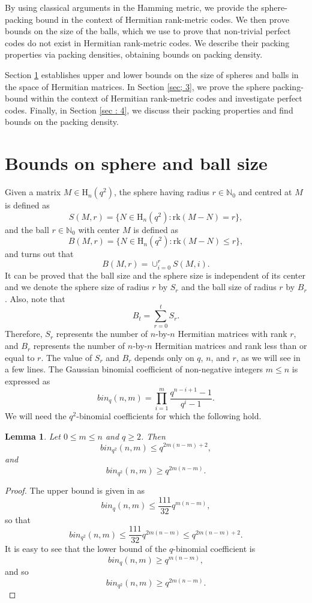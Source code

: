 \documentclass[12pt,a4paper]{article}
\newtheorem{lemma}[theorem]{Lemma}
\begin{document}
 
By using classical arguments in the Hamming metric, we provide the sphere-packing bound in the context of Hermitian rank-metric codes. We then prove bounds on the size of the balls, which we use to prove that non-trivial perfect codes do not exist in Hermitian rank-metric codes. We describe their packing properties via packing densities, obtaining bounds on packing density.

 
Section \ref{sec: 2} establishes upper and lower bounds on the size of spheres and balls in the space of Hermitian matrices. In Section \ref{sec; 3}, we prove the sphere packing-bound within the context of Hermitian rank-metric codes and investigate perfect codes. Finally, in Section \ref{sec : 4}, we discuss their packing properties and find bounds on the {packing density}.  
 
\section{Bounds on sphere and ball size}\label{sec: 2}
Given a matrix $M\in \mathrm{H}_{n}(q^2)$, the sphere having radius $r\in \mathbb{N}_0$  and centred at $M$ is defined as \[ S(M,r)=\{ N \in  \mathrm{H}_n(q^2) \colon \mathrm{rk}(M-N)=r\}, \]
and the ball $r\in \mathbb{N}_0$ with center $M$ is defined as
\[B(M,r)=\{ N \in  \mathrm{H}_n(q^2) \colon \mathrm{rk}(M-N)\leq r\},\]
and turns out that
\[ B(M,r)=\cup_{i=0}^r S(M,i). \]
It can be proved that the ball size and the sphere size is independent of its center and we denote the sphere size of radius $r$ by $S_r$ and the ball size of radius $r$ by $B_r$. Also, note that
\begin{equation*}
  B_t=\sum_{r=0}^{t}S_r.  
\end{equation*}
Therefore, $S_r$ represents the number of $n$-by-$n$ Hermitian matrices with rank $r$, and $B_r$ represents the number of $n$-by-$n$ Hermitian matrices and rank less than or equal to $r$. The value of $S_r$ and $B_r$ depends only on $q$, $n$, and $r$, as we will see in a few lines.
The Gaussian binomial coefficient of non-negative integers $m\leq n$ is expressed as
\[bin_{q}(n,m)=\prod_{i=1}^{m}\frac{q^{n-i+1}-1}{q^{i}-1}.\]
We will need the $q^2$-binomial coefficients for which the following hold.
\begin{lemma}\label{bin}
 Let $0\leq m\leq n$ and $q\geq2$.
 Then
 \[bin_{q^2}(n,m)\leq q^{2m(n-m)+2},\]
 and 
 \[bin_{q^2}(n,m)\geq q^{2m(n-m)}. \]
\end{lemma}
\begin{proof}
    The upper bound is given in  as  
     \[bin_{q}(n,m)\leq{\frac{111}{32}}q^{m(n-m)},\]
     so that 
     \[ bin_{q^2}(n,m)\leq{\frac{111}{32}}q^{2m(n-m)}\leq q^{2m(n-m)+2}.\]
     It is easy to see that the lower bound of the $q$-binomial coefficient is 
     \[bin_{q}(n,m)\geq q^{m(n-m)},\]
     and so 
     \[bin_{q^2}(n,m)\geq q^{2m(n-m)}.\]     
\end{proof}
\end{document}
